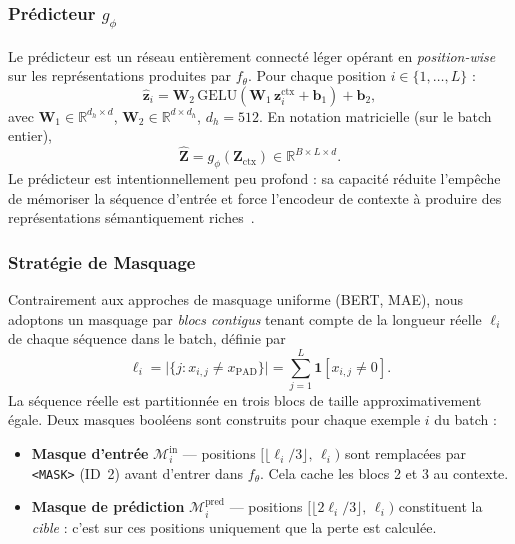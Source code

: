 \subsubsection{Prédicteur \texorpdfstring{$g_\phi$}{g\_phi}}
\label{sub:predictor}
 
Le prédicteur est un réseau entièrement connecté léger opérant en
\emph{position-wise} sur les représentations produites par $f_\theta$.
Pour chaque position $i \in \{1, \ldots, L\}$ :
\[
  \hat{\bm{z}}_i
  = \bm{W}_2\,\mathrm{GELU}\!\left(\bm{W}_1\,\bm{z}^{\text{ctx}}_i
    + \bm{b}_1\right) + \bm{b}_2,
\]
avec $\bm{W}_1 \in \mathbb{R}^{d_h \times d}$,
$\bm{W}_2 \in \mathbb{R}^{d \times d_h}$, $d_h = 512$.
En notation matricielle (sur le batch entier),
\[
  \hat{\bm{Z}} = g_\phi\!\left(\bm{Z}_{\text{ctx}}\right)
  \in \mathbb{R}^{B \times L \times d}.
\]
Le prédicteur est intentionnellement peu profond : sa capacité
réduite l'empêche de mémoriser la séquence d'entrée et force
l'encodeur de contexte à produire des représentations
sémantiquement riches~\cite{assran2023self}.
 
\subsubsection{Stratégie de Masquage}
\label{sub:masking}
 
Contrairement aux approches de masquage uniforme (BERT, MAE), nous
adoptons un masquage par \emph{blocs contigus} tenant compte de la
longueur réelle $\ell_i$ de chaque séquence dans le batch, définie
par
\[
  \ell_i = \bigl|\{j : x_{i,j} \ne x_{\text{PAD}}\}\bigr|
         = \sum_{j=1}^{L} \mathbf{1}[x_{i,j} \ne 0].
\]
La séquence réelle est partitionnée en trois blocs de taille
approximativement égale. Deux masques booléens sont construits pour
chaque exemple $i$ du batch :
 
\begin{itemize}
  \item \textbf{Masque d'entrée} $\mathcal{M}^{\text{in}}_i$ —
    positions $[\lfloor\ell_i/3\rfloor,\, \ell_i)$ sont remplacées
    par \texttt{<MASK>} (ID~2) avant d'entrer dans $f_\theta$.
    Cela cache les blocs 2 et 3 au contexte.
  \item \textbf{Masque de prédiction} $\mathcal{M}^{\text{pred}}_i$
    — positions $[\lfloor 2\ell_i/3\rfloor,\, \ell_i)$ constituent
    la \emph{cible} : c'est sur ces positions uniquement que la
    perte est calculée.
\end{itemize}
 
